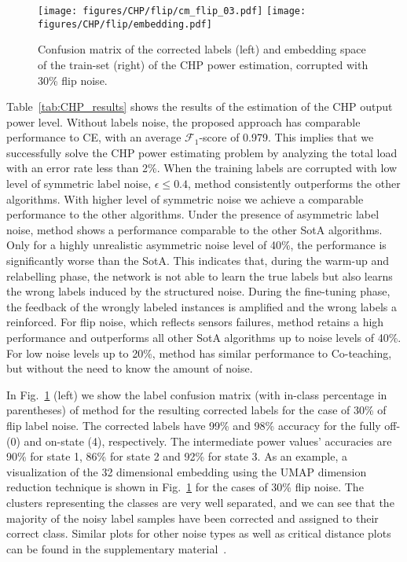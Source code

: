 \documentclass[runningheads, envcountsame, a4paper]{llncs}
\newcommand{\F}{\ensuremath{\mathcal{F}}}
\begin{document}
\begin{figure}[tb]
    \centering
        \texttt{[image: figures/CHP/flip/cm\_flip\_03.pdf]}\:
       \centering
        \texttt{[image: figures/CHP/flip/embedding.pdf]}
    \caption{Confusion matrix of the corrected labels (left) and embedding space of the train-set (right) of the CHP power estimation, corrupted with 30\% flip noise.}
    \label{fig:cm_umap}
\end{figure}


Table~\ref{tab:CHP_results} shows the results of the estimation of the CHP output power level. 
Without labels noise, the proposed approach has comparable performance to CE, with an average  $\F_1$-score of 0.979. 
This implies that we successfully solve the  CHP power estimating  problem  by analyzing the total load with an error rate less than 2\%.
When the training labels are corrupted with low level of symmetric label noise, $\epsilon \leq 0.4$, \acrshort{method} consistently outperforms the other algorithms. With higher level of symmetric noise we achieve a comparable performance to the other algorithms.
Under the presence of asymmetric label noise, \acrshort{method} shows  a performance comparable  to  the other SotA algorithms.
Only for a  highly unrealistic asymmetric noise level of 40\%, the performance is significantly worse than the SotA. This indicates that, during the warm-up and relabelling phase, the network is not able to learn the true labels but also learns the wrong labels induced by the structured noise. During the fine-tuning phase, the feedback of the wrongly labeled instances is amplified and the wrong labels a reinforced. 
For flip noise, which reflects sensors failures, \acrshort{method} retains a high performance and outperforms all other SotA algorithms up to noise levels of 40\%.
For low noise levels up to 20\%, \acrshort{method} has similar performance to  Co-teaching, but without the need to know the amount of noise. 

In Fig.~\ref{fig:cm_umap} (left) we show the label confusion matrix (with in-class percentage in parentheses) of \acrshort{method} for the resulting corrected labels for the case of 30\% of flip label noise.  
The corrected labels have 99\% and 98\% accuracy for the fully off- (0) and on-state (4), respectively. The intermediate power values' accuracies are 90\% for state 1, 86\% for state 2 and 92\% for state 3.
As an example, a visualization of the 32 dimensional embedding using the  UMAP \cite{McInnes2018UMAPUM} dimension reduction technique is shown in Fig.~\ref{fig:cm_umap} for the cases of 30\% flip noise. 
The clusters representing the classes are very well separated, and we can see that the majority of the noisy label samples have been corrected and assigned to their correct class. Similar plots for other noise types as well as critical distance plots can be found in the supplementary material~\cite{castellaniSuppl2021}.
\end{document}
